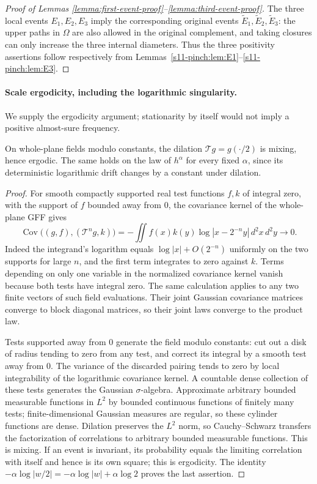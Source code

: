 \documentclass[12pt]{amsart}
\numberwithin{equation}{section}
\begin{document}
\begin{proof}[Proof of Lemmas \ref{lemma:first-event-proof}--\ref{lemma:third-event-proof}]
The three local events $E_1,E_2,E_3$ imply the corresponding original events $\tilde E_1,\tilde E_2,\tilde E_3$: the upper paths in $\Omega$ are also allowed in the original complement, and taking closures can only increase the three internal diameters. Thus the three positivity assertions follow respectively from Lemmas~\ref{s11-pinch:lem:E1}--\ref{s11-pinch:lem:E3}.
\end{proof}

\paragraph{Scale ergodicity, including the logarithmic singularity.}
We supply the ergodicity argument; stationarity by itself would
not imply a positive almost-sure frequency.

\begin{lemma}\label{s11-pinch:lem:mixing}
On whole-plane fields modulo constants, the dilation
$\mathcal T g=g(\cdot/2)$ is mixing, hence ergodic.
The same holds on the law of $h^\alpha$ for every fixed
$\alpha$, since its deterministic logarithmic drift changes
by a constant under dilation.
\end{lemma}
\begin{proof}
For smooth compactly supported real test functions $f,k$ of
integral zero, with the support of $f$ bounded away from $0$,
the covariance kernel of the whole-plane GFF gives
\[
 \operatorname{Cov}\big((g,f),(\mathcal T^n g,k)\big)
 =-\iint f(x)k(y)\log|x-2^{-n}y|\,d^2x\,d^2y
 \longrightarrow0.
\]
Indeed the integrand's logarithm equals
$\log|x|+O(2^{-n})$ uniformly on the two supports for large $n$,
and the first term integrates to zero against $k$.
Terms depending on only one variable in the normalized covariance
kernel vanish because both tests have integral zero.
The same calculation applies to any two finite vectors of
such field evaluations. Their joint Gaussian covariance matrices
converge to block diagonal matrices, so their joint laws
converge to the product law.

Tests supported away from $0$ generate the field modulo constants:
cut out a disk of radius tending to zero from any test, and
correct its integral by a smooth test away from $0$. The
variance of the discarded pairing tends to zero by local
integrability of the logarithmic covariance kernel. A countable
dense collection of these tests generates the Gaussian
$\sigma$-algebra. Approximate arbitrary bounded measurable
functions in $L^2$ by bounded continuous functions of finitely
many tests; finite-dimensional Gaussian measures are regular,
so these cylinder functions are dense. Dilation
preserves the $L^2$ norm, so Cauchy--Schwarz transfers the
factorization of correlations to arbitrary bounded measurable
functions. This is mixing. If an event is invariant, its
probability equals the limiting correlation with itself and
hence is its own square; this is ergodicity.
The identity
$-\alpha\log|w/2|=-\alpha\log|w|+\alpha\log2$ proves the
last assertion.
\end{proof}
\end{document}
